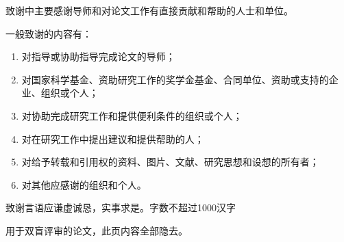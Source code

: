 致谢中主要感谢导师和对论文工作有直接贡献和帮助的人士和单位。

一般致谢的内容有：
\begin{enumerate}[label=（\chinese*）,itemindent=2em]

    \item 对指导或协助指导完成论文的导师；
    \item 对国家科学基金、资助研究工作的奖学金基金、合同单位、资助或支持的企业、组织或个人；
    \item 对协助完成研究工作和提供便利条件的组织或个人；
    \item 对在研究工作中提出建议和提供帮助的人；
    \item 对给予转载和引用权的资料、图片、文献、研究思想和设想的所有者；
    \item 对其他应感谢的组织和个人。

\end{enumerate}

致谢言语应谦虚诚恳，实事求是。字数不超过1000汉字

\vspace{\baselineskip}
{\color{red} 用于双盲评审的论文，此页内容全部隐去。}

